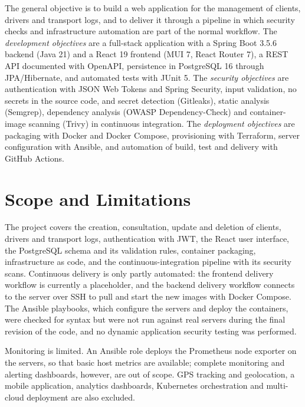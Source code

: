 The general objective is to build a web application for the management of clients, drivers and transport logs, and to deliver it through a pipeline in which security checks and infrastructure automation are part of the normal workflow. The \emph{development objectives} are a full-stack application with a Spring Boot 3.5.6 backend (Java 21) and a React 19 frontend (MUI 7, React Router 7), a REST API documented with OpenAPI, persistence in PostgreSQL 16 through JPA/Hibernate, and automated tests with JUnit 5. The \emph{security objectives} are authentication with JSON Web Tokens and Spring Security, input validation, no secrets in the source code, and secret detection (Gitleaks), static analysis (Semgrep), dependency analysis (OWASP Dependency-Check) and container-image scanning (Trivy) in continuous integration. The \emph{deployment objectives} are packaging with Docker and Docker Compose, provisioning with Terraform, server configuration with Ansible, and automation of build, test and delivery with GitHub Actions.

\section{Scope and Limitations}

The project covers the creation, consultation, update and deletion of clients, drivers and transport logs, authentication with JWT, the React user interface, the PostgreSQL schema and its validation rules, container packaging, infrastructure as code, and the continuous-integration pipeline with its security scans. Continuous delivery is only partly automated: the frontend delivery workflow is currently a placeholder, and the backend delivery workflow connects to the server over SSH to pull and start the new images with Docker Compose. The Ansible playbooks, which configure the servers and deploy the containers, were checked for syntax but were not run against real servers during the final revision of the code, and no dynamic application security testing was performed.

Monitoring is limited. An Ansible role deploys the Prometheus node exporter on the servers, so that basic host metrics are available; complete monitoring and alerting dashboards, however, are out of scope. GPS tracking and geolocation, a mobile application, analytics dashboards, Kubernetes orchestration and multi-cloud deployment are also excluded.


